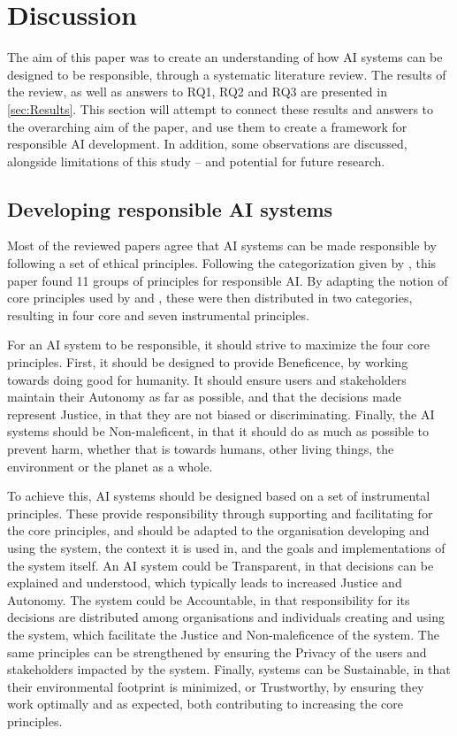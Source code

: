 \section{Discussion}
\label{sec:Discussion}
The aim of this paper was to create an understanding of how AI systems can be designed to be responsible, through a systematic literature review. The results of the review, as well as answers to RQ1, RQ2 and RQ3 are presented in \autoref{sec:Results}. This section will attempt to connect these results and answers to the overarching aim of the paper, and use them to create a framework for responsible AI development. In addition, some observations are discussed, alongside limitations of this study -- and potential for future research.

\subsection{Developing responsible AI systems}
Most of the reviewed papers agree that AI systems can be made responsible by following a set of ethical principles. Following the categorization given by \textcite{Ryan_2021}, this paper found 11 groups of principles for responsible AI. By adapting the notion of core principles used by \textcite{Canca_2020} and \textcite{Floridi_2018}, these were then distributed in two categories, resulting in four core and seven instrumental principles. 

For an AI system to be responsible, it should strive to maximize the four core principles. First, it should be designed to provide Beneficence, by working towards doing good for humanity. It should ensure users and stakeholders maintain their Autonomy as far as possible, and that the decisions made represent Justice, in that they are not biased or discriminating. Finally, the AI systems should be Non-maleficent, in that it should do as much as possible to prevent harm, whether that is towards humans, other living things, the environment or the planet as a whole.

To achieve this, AI systems should be designed based on a set of instrumental principles. These provide responsibility through supporting and facilitating for the core principles, and should be adapted to the organisation developing and using the system, the context it is used in, and the goals and implementations of the system itself. An AI system could be Transparent, in that decisions can be explained and understood, which typically leads to increased Justice and Autonomy. The system could be Accountable, in that responsibility for its decisions are distributed among organisations and individuals creating and using the system, which facilitate the Justice and Non-maleficence of the system. The same principles can be strengthened by ensuring the Privacy of the users and stakeholders impacted by the system. Finally, systems can be Sustainable, in that their environmental footprint is minimized, or Trustworthy, by ensuring they work optimally and as expected, both contributing to increasing the core principles.

